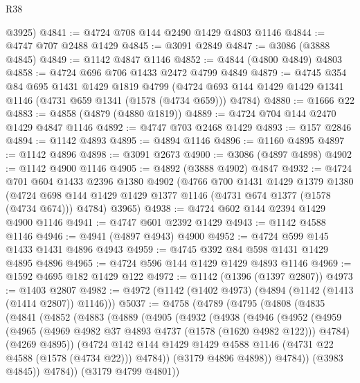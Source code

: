 \begin{lexlean}{R38}
\begin{coremodule}
      @3925)
@4841 := @4724 @708 @144 @2490 @1429 @4803 @1146
@4844 := @4747 @707 @2488 @1429
@4845 := @3091 @2849
@4847 := @3086 (@3888 @4845)
@4849 := @1142 @4847 @1146
@4852 := @4844 (@4800 @4849) @4803
@4858 := @4724 @696 @706 @1433 @2472 @4799 @4849
@4879 := @4745
    @354
    @84
    @695
    @1431
    @1429
    @1819
    @4799
    (@4724 @693 @144 @1429 @1429 @1341 @1146 (@4731 @659 @1341 (@1578 (@4734 @659))) @4784)
@4880 := @1666 @22
@4883 := @4858 (@4879 (@4880 @1819))
@4889 := @4724 @704 @144 @2470 @1429 @4847 @1146
@4892 := @4747 @703 @2468 @1429
@4893 := @157 @2846
@4894 := @1142 @4893
@4895 := @4894 @1146
@4896 := @1160 @4895
@4897 := @1142 @4896
@4898 := @3091 @2673
@4900 := @3086 (@4897 @4898)
@4902 := @1142 @4900 @1146
@4905 := @4892 (@3888 @4902) @4847
@4932 := @4724
    @701
    @604
    @1433
    @2396
    @1380
    @4902
    (@4766
      @700
      @1431
      @1429
      @1379
      @1380
      (@4724 @698 @144 @1429 @1429 @1377 @1146 (@4731 @674 @1377 (@1578 (@4734 @674))) @4784)
      @3965)
@4938 := @4724 @602 @144 @2394 @1429 @4900 @1146
@4941 := @4747 @601 @2392 @1429
@4943 := @1142 @4588 @1146
@4946 := @4941 (@4897 @4943) @4900
@4952 := @4724 @599 @145 @1433 @1431 @4896 @4943
@4959 := @4745 @392 @84 @598 @1431 @1429 @4895 @4896
@4965 := @4724 @596 @144 @1429 @1429 @4893 @1146
@4969 := @1592 @4695 @182 @1429 @122
@4972 := @1142 (@1396 (@1397 @2807))
@4973 := @1403 @2807
@4982 := @4972 (@1142 (@1402 @4973) (@4894 (@1142 (@1413 (@1414 @2807)) @1146)))
@5037 := @4758
    (@4789
      (@4795
        (@4808
          (@4835
            (@4841
              (@4852
                (@4883
                  (@4889
                    (@4905
                      (@4932
                        (@4938
                          (@4946
                            (@4952
                              (@4959
                                (@4965
                                  (@4969 @4982 @37 @4893 @4737 (@1578 (@1620 @4982 @122)))
                                  @4784)
                                (@4269 @4895))
                              (@4724
                                @142
                                @144
                                @1429
                                @1429
                                @4588
                                @1146
                                (@4731 @22 @4588 (@1578 (@4734 @22)))
                                @4784))
                            (@3179 @4896 @4898))
                          @4784))
                      (@3983 @4845))
                    @4784))
                (@3179 @4799 @4801))

\end{coremodule}
\end{lexlean}
